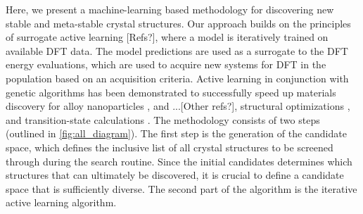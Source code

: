 %
%


Here, we present a machine-learning based methodology for discovering new stable and meta-stable crystal structures.
%
Our approach builds on the principles of surrogate active learning [Refs?],
where a model is iteratively trained on available DFT data.
%
The model predictions are used as a surrogate to the DFT energy evaluations,
which are used to acquire new systems for DFT in the population based on an acquisition criteria.
Active learning in conjunction with genetic algorithms has been demonstrated to successfully speed up materials discovery for alloy nanoparticles \cite{Jennings2019}, and ...[Other refs?],  structural optimizations \cite{hansen2019atomistic}, and transition-state calculations \cite{torres2019low}.
The methodology consists of two steps (outlined in  \ref{fig:all_diagram}).
%
The first step is the generation of the candidate space,
which defines the inclusive list of all crystal structures to be screened through during the search routine.
%
Since the initial candidates determines which structures that can ultimately be discovered, it is crucial to define a candidate space that is sufficiently diverse.
The second part of the algorithm is the iterative active learning algorithm.

